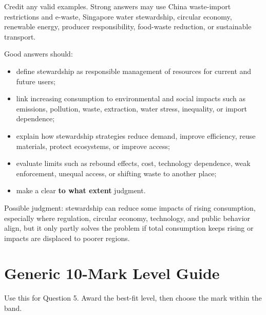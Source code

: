 \documentclass[11pt,a4paper]{article}
\newcommand{\exam}[1]{\textcolor{AccentTeal}{\textbf{#1}}}
\begin{document}
Credit any valid examples. Strong answers may use China waste-import
restrictions and e-waste, Singapore water stewardship, circular economy,
renewable energy, producer responsibility, food-waste reduction, or sustainable
transport.

Good answers should:

\begin{itemize}
  \item define stewardship as responsible management of resources for current
  and future users;
  \item link increasing consumption to environmental and social impacts such as
  emissions, pollution, waste, extraction, water stress, inequality, or import
  dependence;
  \item explain how stewardship strategies reduce demand, improve efficiency,
  reuse materials, protect ecosystems, or improve access;
  \item evaluate limits such as rebound effects, cost, technology dependence,
  weak enforcement, unequal access, or shifting waste to another place;
  \item make a clear \exam{to what extent} judgment.
\end{itemize}

Possible judgment: stewardship can reduce some impacts of rising consumption,
especially where regulation, circular economy, technology, and public behavior
align, but it only partly solves the problem if total consumption keeps rising
or impacts are displaced to poorer regions.

\newpage

\section{Generic 10-Mark Level Guide}

Use this for Question 5. Award the best-fit level, then choose the mark within
the band.
\end{document}
